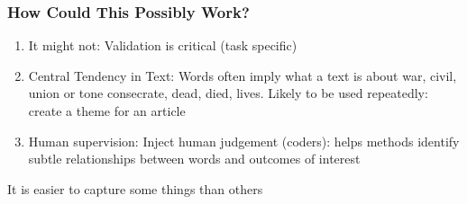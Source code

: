 \documentclass[compress, aspectratio=54]{beamer}
\begin{document}



\begin{frame}
\frametitle{How Could This Possibly Work?}

\begin{enumerate}
\item It might not: Validation is critical (task specific)

\item Central Tendency in Text: Words often imply what a text is about
war, civil, union or tone consecrate, dead, died, lives.
Likely to be used repeatedly: create a theme for an article

\item Human supervision: Inject human judgement (coders): helps methods
identify subtle relationships between words and outcomes of interest

\end{enumerate}
It is easier to capture some things than others
\end{frame}
\end{document}
